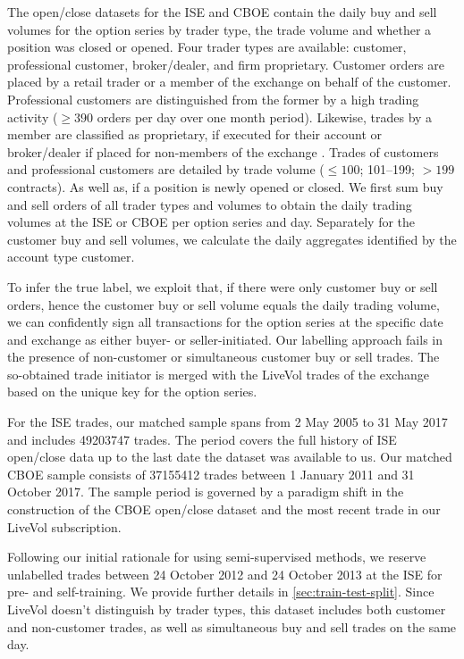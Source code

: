 The open/close datasets for the \gls{ISE} and \gls{CBOE} contain the daily buy and sell volumes for the option series by trader type, the trade volume and whether a position was closed or opened. Four trader types are available: customer, professional customer, broker/dealer, and firm proprietary. Customer orders are placed by a retail trader or a member of the exchange on behalf of the customer. Professional customers are distinguished from the former by a high trading activity ($\geq390$ orders per day over one month period). Likewise, trades by a member are classified as proprietary, if executed for their account or broker/dealer if placed for non-members of the exchange \autocite[][2]{nasdaqincFrequentlyAskedQuestions2017}. Trades of customers and professional customers are detailed by trade volume ($\leq 100$; 101--199; $> 199$ contracts). As well as, if a position is newly opened or closed. We first sum buy and sell orders of all trader types and volumes to obtain the daily trading volumes at the \gls{ISE} or \gls{CBOE} per option series and day. Separately for the customer buy and sell volumes, we calculate the daily aggregates identified by the account type customer.

To infer the true label, we exploit that, if there were only customer buy or sell orders, hence the customer buy or sell volume equals the daily trading volume, we can confidently sign all transactions for the option series at the specific date and exchange as either buyer- or seller-initiated. Our labelling approach fails in the presence of non-customer or simultaneous customer buy or sell trades. The so-obtained trade initiator is merged with the LiveVol trades of the exchange based on the unique key for the option series.

For the \gls{ISE} trades, our matched sample spans from 2 May 2005 to 31 May 2017 and includes \num{49203747} trades. The period covers the full history of \gls{ISE} open/close data up to the last date the dataset was available to us. Our matched \gls{CBOE} sample consists of \num{37155412} trades between 1 January 2011 and 31 October 2017. The sample period is governed by a paradigm shift in the construction of the \gls{CBOE} open/close dataset and the most recent trade in our LiveVol subscription.

Following our initial rationale for using semi-supervised methods, we reserve unlabelled trades between 24 October 2012 and 24 October 2013 at the \gls{ISE} for pre- and self-training. We provide further details in \cref{sec:train-test-split}. Since LiveVol doesn't distinguish by trader types, this dataset includes both customer and non-customer trades, as well as simultaneous buy and sell trades on the same day.

